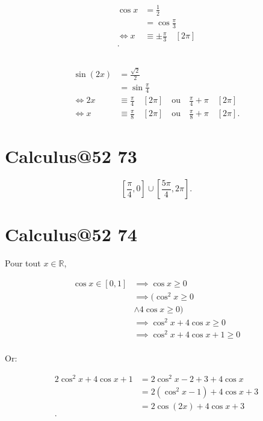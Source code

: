 \documentclass{article}
\newcommand{\R}{\mathbb{R}}
\begin{document}
\subsection{}
\begin{align*}
	\cos x &= \frac{1}{2} \\
	       &= \cos \frac{\pi}{3} \\
	\iff x &\equiv \pm \frac{\pi}{3}\quad[2\pi] \\
.\end{align*}

\subsection{}
\begin{align*}
	\sin(2x) &= \frac{\sqrt{2} }{2}  \\
		 &= \sin \frac{\pi}{4} \\
	\iff 2x &\equiv \frac{\pi}{4} \quad[2\pi]\quad\text{ou}\quad \frac{\pi}{4}+\pi\quad[2\pi]\\
	\iff x &\equiv \frac{\pi}{8}\quad [2\pi] \quad\text{ou}\quad \frac{\pi}{8} + \pi\quad[2\pi] 
.\end{align*}

\section{Calculus@52 73} %

\[
	\left[ \frac{\pi}{4}, 0 \right] \cup \left[ \frac{5\pi}{4}, 2\pi \right]
.\]

\section{Calculus@52 74} %

Pour tout $x \in  \R$, 

\begin{align*}
	\cos x \in [0, 1] &\implies \cos x \ge 0 \\
			  &\implies ( \cos^2x \ge 0 \\
			  &\land 4\cos x \ge 0 ) \\
			  &\implies \cos^2x + 4\cos x \ge 0 \\
			  &\implies \cos^2x + 4\cos x + 1 \ge  0 \\
\end{align*}

Or:

\begin{align*}
	2\cos^2x + 4\cos x + 1 &= 2\cos^2x - 2 + 3 + 4\cos x  \\
			       &= 2(\cos^2x - 1) + 4\cos x + 3  \\
			       &= 2\cos(2x)+4\cos x + 3  \\
.\end{align*}
\end{document}
